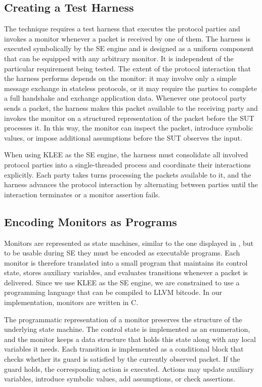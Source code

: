 \subsection{Creating a Test Harness}\label{sec:paper2:test-harness}
The technique requires a test harness that executes the protocol parties and invokes a monitor whenever a packet is received by one of them.
The harness is executed symbolically by the SE engine and is designed as a uniform component that can be equipped with any arbitrary monitor.
It is independent of the particular requirement being tested.
The extent of the protocol interaction that the harness performs depends on the monitor: it may involve only a simple message exchange in stateless protocols, or it may require the parties to complete a full handshake and exchange application data.
Whenever one protocol party sends a packet, the harness makes this packet available to the receiving party and invokes the monitor on a structured representation of the packet before the SUT processes it.
In this way, the monitor can inspect the packet, introduce symbolic values, or impose additional assumptions before the SUT observes the input.

When using KLEE as the SE engine, the harness must consolidate all involved protocol parties into a single-threaded process and coordinate their interactions explicitly.
Each party takes turns processing the packets available to it, and the harness advances the protocol interaction by alternating between parties until the interaction terminates or a monitor assertion fails.

\subsection{Encoding Monitors as Programs}\label{sec:monitorencoding}
Monitors are represented as state machines, similar to the one displayed in , but to be usable during SE they must be encoded as executable programs.
Each monitor is therefore translated into a small program that maintains its control state, stores auxiliary variables, and evaluates transitions whenever a packet is delivered.
Since we use KLEE as the SE engine, we are constrained to use a programming language that can be compiled to LLVM bitcode.
In our implementation, monitors are written in C.

The programmatic representation of a monitor preserves the structure of the underlying state machine. 
The control state is implemented as an enumeration, and the monitor keeps a data structure that holds this state along with any local variables it needs.
Each transition is implemented as a conditional block that checks whether its guard is satisfied by the currently observed packet. 
If the guard holds, the corresponding action is executed. 
Actions may update auxiliary variables, introduce symbolic values, add assumptions, or check assertions.

